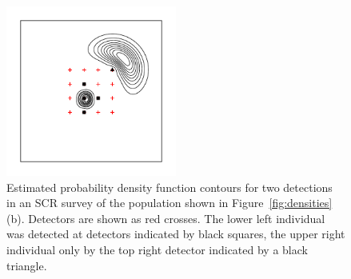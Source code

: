 \documentclass[useAMS,usenatbib,referee]{biom}
\begin{document}
\begin{figure}[htbp]
\centering
\includegraphics[width=0.5\textwidth]{screrr.pdf}
\caption{Estimated probability density function contours for two detections in an SCR survey of the population shown in Figure~\ref{fig:densities}(b). Detectors are shown as red crosses. The lower left individual was detected at detectors indicated by black squares, the upper right individual only by the top right detector indicated by a black triangle.}
\label{fig:screrr}
\end{figure}


\end{document}
